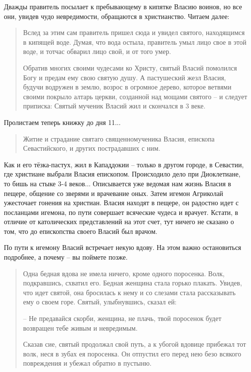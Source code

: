\documentclass[a5paper,11pt,openany]{article}
\begin{document}
Дважды правитель посылает к пребывающему в кипятке Власию воинов, но все они, увидев чудо невредимости, обращаются в христианство. Читаем далее:

\begin{quotation}
\noindent Вслед за этим сам правитель пришел сюда и увидел святого, находящимся в кипящей воде. Думая, что вода остыла, правитель умыл лицо свое в этой воде, и тотчас обварил лицо свой, и от того умер.

   Обратив многих своими чудесами ко Христу, святый Власий помолился Богу и предам ему свою святую душу. А пастушеский жезл Власия, будучи водружен в землю, возрос в огромное дерево, которое ветвями своими покрыло алтарь церкви, созданной над мощами святого – и следует приписка: Святый мученик Власий жил и скончался в 3 веке.
\end{quotation}

Пролистаем теперь книжку до дня 11...


\begin{quotation}
Житие и страдание святаго священномученика Власия, епископа Севастийского, и других пострадавших с ним.
\end{quotation}

 Как и его тёзка-пастух, жил в Кападдокии – только в другом городе, в Севастии, где христиане выбрали Власия епископом. Происходило дело при Диоклетиане, то бишь на стыке 3-4 веков... Описывается уже ведомая нам жизнь Власия в пещере, общение со зверями и врачевание оных. Затем игемон Агриколай ужесточает гонения на христиан. Власия находят в пещере, он радостно идет с посланцами игемона, по пути совершает всяческие чудеса и врачует. Кстати, в отличие от католических представлений на этот счет, тут ничего не сказано о том, что до епископства своего Власий был врачом. 

   По пути к игемону Власий встречает некую вдову. На этом важно остановиться подробнее, а почему – вы поймете позже.

\begin{quotation}
\noindent Одна бедная вдова не имела ничего, кроме одного поросенка. Волк, подкравшись, схватил его. Бедная женщина стала горько плакать. Увидев, что идет святой, она бросилась к нему и со слезами стала рассказывать ему о своем горе. Святый, улыбнувшись, сказал ей:

 – Не предавайся скорби, женщина, не плачь, твой поросенок будет возвращен тебе живым и невредимым.

   Сказав сие, святый продолжал свой путь, а к убогой вдовице прибежал тот волк, неся в зубах ея поросенка. Он отпустил его перед нею безо всякого повреждения и убежал обратно в пустыню.
\end{quotation}
\end{document}
